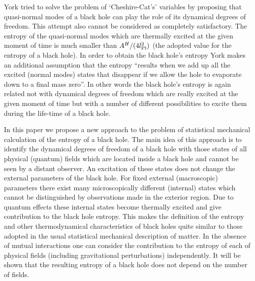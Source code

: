 \documentclass[superscriptaddress,showpacs,preprintnumbers,amsmath,amssymb,
nofootinbib,aps,prd,12pt]{revtex4-1}
\begin{document}
York \cite{York:83} tried to  solve the problem of  `Cheshire-Cat's'
variables by proposing that  quasi-normal modes of a black  hole
can play the role  of its dynamical degrees  of freedom. This attempt
also cannot be considered  as completely satisfactory.  The entropy of
the quasi-normal modes which are thermally excited at the given moment
of time is much  smaller than  $A^H/(4l_{\mbox{\scriptsize{Pl}}}^2)$ (the
adopted
value for the  entropy of a  black hole). In  order
to obtain  the   black  hole's    entropy  York \cite{York:83}  makes  an
additional assumption that the entropy ``results  when we  add up  all
the excited (normal modes) states that  disappear if   we allow the
hole  to  evaporate down to  a final mass  zero''. In other words the
black  hole's entropy is  again  related  not  with  dynamical  degrees
of freedom which are really  excited  at  the  given  moment  of  time
but with a number of different possibilities to excite them during the
life-time of a black hole.

In this paper we propose a new approach to the problem of  statistical
mechanical calculation of the entropy  of a black hole. The  main idea
of this approach is to identify the dynamical degrees of freedom of  a
black  hole  with  those  states  of all physical (quantum) fields which
are located  inside   a black   hole   and   cannot   be   seen  by  a
distant observer.   An   excitation    of   these   states   does  not
change   the    external parameters  of the    black  hole. For  fixed
external    (macroscopic)  parameters      there      exist       many
microscopically      different   (internal)     states           which
cannot       be   distinguished    by observations made in the
exterior region.   Due  to  quantum
effects  these   internal  states become  thermally excited  and  give
contribution to  the black hole  entropy.  This makes  the  definition
of the   entropy and   other thermodynamical characteristics  of black
holes quite similar to those adopted in
the usual  statistical  mechanical description
of matter. In the absence of mutual interactions one can consider  the
contribution  to  the  entropy  of  each of physical fields (including
gravitational  perturbations)  independently.  It  will be shown that
the  resulting   entropy of  a black  hole does  not depend on the
number of fields.
\end{document}
